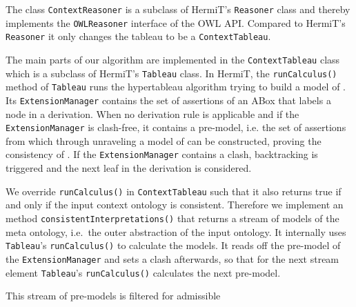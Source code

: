 The class \texttt{ContextReasoner} is a subclass of HermiT's \texttt{Reasoner} class and thereby
implements the \texttt{OWLReasoner} interface of the OWL API. Compared to HermiT's \texttt{Reasoner}
it only changes the tableau to be a \texttt{ContextTableau}.

The main parts of our algorithm are implemented in the \texttt{ContextTableau} class which is a
subclass of HermiT's \texttt{Tableau} class.  In HermiT, the \texttt{runCalculus()} method of
\texttt{Tableau} runs the hypertableau algorithm trying to build a model of \CA.  Its
\texttt{ExtensionManager} contains the set of assertions of an ABox that labels a node in a
derivation. When no derivation rule is applicable and if the \texttt{ExtensionManager} is
clash-free, it contains a pre-model, i.e. the set of assertions from which through unraveling a
model of \CA can be constructed, proving the consistency of \CA.  If the \texttt{ExtensionManager}
contains a clash, backtracking is triggered and the next leaf in the derivation is considered.

We override \texttt{runCalculus()} in \texttt{ContextTableau} such that it also returns true if and
only if the input context ontology is consistent.  Therefore we implement an method
\texttt{consistentInterpretations()} that returns a stream of models of the meta ontology, i.e.\ the
outer abstraction of the input ontology.  It internally uses \texttt{Tableau}'s \texttt{runCalculus()}
to calculate the models. It reads off the pre-model of the \texttt{ExtensionManager} and sets a
clash afterwards, so that for the next stream element \texttt{Tableau}'s \texttt{runCalculus()}
calculates the next pre-model.

This stream of pre-models is filtered for admissible 



